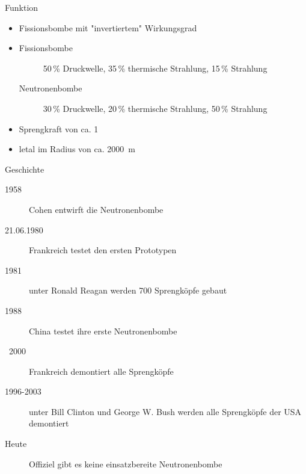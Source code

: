 \begin{frame}{Funktion}
	\begin{itemize}
		\item Fissionsbombe mit "invertiertem" Wirkungsgrad
		\item \begin{description}
						\item[Fissionsbombe] 50\,\% Druckwelle, 35\,\% thermische Strahlung, 15\,\% Strahlung
						\item[Neutronenbombe] 30\,\% Druckwelle, 20\,\% thermische Strahlung, 50\,\% Strahlung
					\end{description}
		\item Sprengkraft von ca. \SI{1}{\kilo \tnt}
		\item letal im Radius von ca. \SI{2000}{\meter}
	\end{itemize}
\end{frame}
\begin{frame}{Geschichte}
	\begin{description}
		\item[1958] Cohen entwirft die Neutronenbombe
		\item[21.06.1980] Frankreich testet den ersten Prototypen
		\item[1981] unter Ronald Reagan werden 700 Sprengköpfe gebaut
		\item[1988] China testet ihre erste Neutronenbombe
		\item[~2000] Frankreich demontiert alle Sprengköpfe
		\item[1996-2003] unter Bill Clinton und George W. Bush werden alle Sprengköpfe der USA demontiert
		\item[Heute] Offiziel gibt es keine einsatzbereite Neutronenbombe
	\end{description}
\end{frame}

